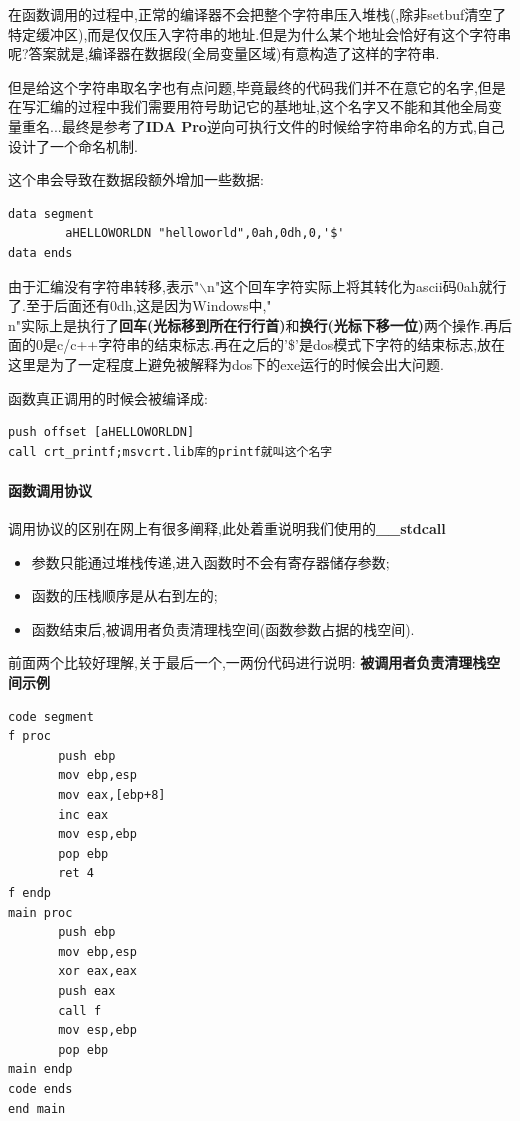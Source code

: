 \documentclass{article}
\begin{document}
在函数调用的过程中,正常的编译器不会把整个字符串压入堆栈(,除非setbuf清空了特定缓冲区),而是仅仅压入字符串的地址.但是为什么某个地址会恰好有这个字符串呢?答案就是,编译器在数据段(全局变量区域)有意构造了这样的字符串.


但是给这个字符串取名字也有点问题,毕竟最终的代码我们并不在意它的名字,但是在写汇编的过程中我们需要用符号助记它的基地址,这个名字又不能和其他全局变量重名...最终是参考了\textbf{IDA Pro}逆向可执行文件的时候给字符串命名的方式,自己设计了一个命名机制.


这个串会导致在数据段额外增加一些数据:

\begin{verbatim}
data segment
        aHELLOWORLDN "helloworld",0ah,0dh,0,'$'
data ends
\end{verbatim}

由于汇编没有字符串转移,表示"$\backslash$n"这个回车字符实际上将其转化为ascii码0ah就行了.至于后面还有0dh,这是因为Windows中,"\\n"实际上是执行了\textbf{回车(光标移到所在行行首)}和\textbf{换行(光标下移一位)}两个操作.再后面的0是c/c++字符串的结束标志.再在之后的'\$'是dos模式下字符的结束标志,放在这里是为了一定程度上避免被解释为dos下的exe运行的时候会出大问题.


函数真正调用的时候会被编译成:

\begin{verbatim}
push offset [aHELLOWORLDN]
call crt_printf;msvcrt.lib库的printf就叫这个名字
\end{verbatim}


\paragraph{函数调用协议\\}

调用协议的区别在网上有很多阐释,此处着重说明我们使用的\textbf{\_\_stdcall}

\begin{itemize}
\item 参数只能通过堆栈传递,进入函数时不会有寄存器储存参数;
\item 函数的压栈顺序是从右到左的;
\item  函数结束后,被调用者负责清理栈空间(函数参数占据的栈空间).
\end{itemize}

前面两个比较好理解,关于最后一个,一两份代码进行说明:
\textbf{被调用者负责清理栈空间示例}

\begin{verbatim}
code segment
f proc
       push ebp
       mov ebp,esp 
       mov eax,[ebp+8]
       inc eax
       mov esp,ebp
       pop ebp
       ret 4
f endp
main proc
       push ebp
       mov ebp,esp
       xor eax,eax
       push eax
       call f
       mov esp,ebp
       pop ebp
main endp
code ends
end main
\end{verbatim}
\end{document}
